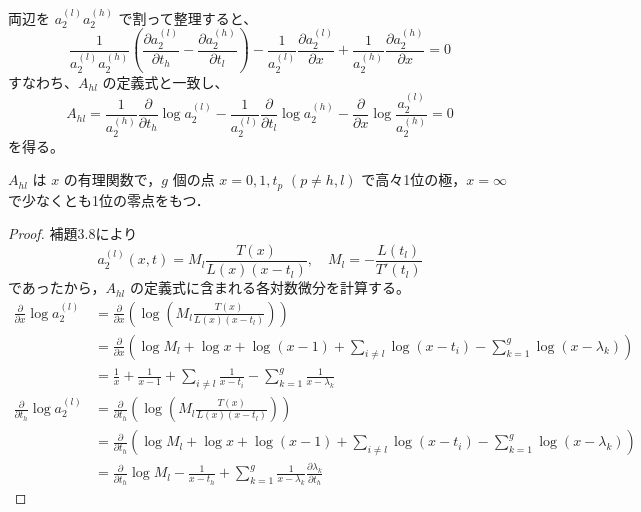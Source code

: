 両辺を $a_2^{(l)} a_2^{(h)}$ で割って整理すると、
\begin{equation*}
    \frac{1}{a_2^{(l)}a_2^{(h)}} \left( \frac{\partial a_2^{(l)}}{\partial t_h} - \frac{\partial a_2^{(h)}}{\partial t_l} \right) - \frac{1}{a_2^{(l)}} \frac{\partial a_2^{(l)}}{\partial x} + \frac{1}{a_2^{(h)}} \frac{\partial a_2^{(h)}}{\partial x} = 0
\end{equation*}
すなわち、$A_{hl}$ の定義式と一致し、
\begin{equation}
    A_{hl} = \frac{1}{a_2^{(h)}} \frac{\partial}{\partial t_h} \log a_2^{(l)} - \frac{1}{a_2^{(l)}} \frac{\partial}{\partial t_l} \log a_2^{(h)} - \frac{\partial}{\partial x} \log \frac{a_2^{(l)}}{a_2^{(h)}} = 0 \label{eq:A_hl_def}
\end{equation}
を得る。

\begin{story}

\begin{lemma}
    $A_{hl}$ は $x$ の有理関数で，$g$ 個の点 $x=0, 1, t_p$ $(p \neq h, l)$ で高々1位の極，$x=\infty$ で少なくとも1位の零点をもつ．
\end{lemma}

\begin{proof}
    補題3.8により
    \begin{equation*}
        a_2^{(l)}(x,t) = M_l \frac{T(x)}{L(x)(x-t_l)}, \quad M_l = -\frac{L(t_l)}{T'(t_l)}
    \end{equation*}
    であったから，$A_{hl}$ の定義式に含まれる各対数微分を計算する。
\begin{align*}
    \frac{\partial}{\partial x} \log a_2^{(l)} &= \frac{\partial}{\partial x} \left( \log \left( M_l \frac{T(x)}{L(x)(x-t_l)} \right) \right) \\
    &= \frac{\partial}{\partial x} \left( \log M_l + \log x + \log(x-1) + \sum_{i \neq l} \log(x-t_i) - \sum_{k=1}^g \log(x-\lambda_k) \right) \\
    &= \frac{1}{x} + \frac{1}{x-1} + \sum_{i \neq l} \frac{1}{x-t_i} - \sum_{k=1}^g \frac{1}{x-\lambda_k} \\[8pt]
    \frac{\partial}{\partial t_h} \log a_2^{(l)} &= \frac{\partial}{\partial t_h} \left( \log \left( M_l \frac{T(x)}{L(x)(x-t_l)} \right) \right) \\
    &= \frac{\partial}{\partial t_h} \left( \log M_l + \log x + \log(x-1) + \sum_{i \neq l} \log(x-t_i) - \sum_{k=1}^g \log(x-\lambda_k) \right) \\
    &= \frac{\partial}{\partial t_h} \log M_l - \frac{1}{x-t_h} + \sum_{k=1}^g \frac{1}{x-\lambda_k} \frac{\partial \lambda_k}{\partial t_h}
\end{align*}


\end{proof}
\end{story}
